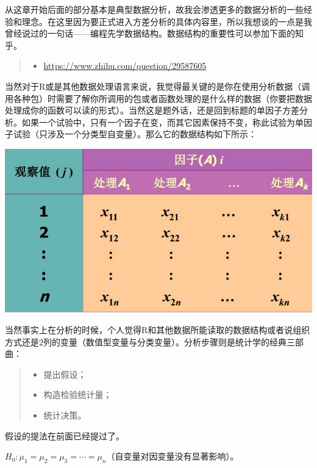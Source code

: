 \documentclass[]{ctexbook}
\providecommand{\tightlist}{%
  \setlength{\itemsep}{0pt}\setlength{\parskip}{0pt}}
\begin{document}
从这章开始后面的部分基本是典型数据分析，故我会渗透更多的数据分析的一些经验和理念。在这里因为要正式进入方差分析的具体内容里，所以我想谈的一点是我曾经说过的一句话------编程先学数据结构。数据结构的重要性可以参加下面的知乎。

\begin{quote}
\begin{itemize}
\tightlist
\item
  \url{https://www.zhihu.com/question/29587605}
\end{itemize}
\end{quote}

当然对于R或是其他数据处理语言来说，我觉得最关键的是你在使用分析数据（调用各种包）时需要了解你所调用的包或者函数处理的是什么样的数据（你要把数据处理成你的函数可以读的形式）。当然这是题外话，还是回到标题的单因子方差分析。如果一个试验中，只有一个因子在变，而其它因素保持不变，称此试验为单因子试验（只涉及一个分类型自变量）。那么它的数据结构如下所示：

\includegraphics[width=1\linewidth,height=0.35\textheight]{fig/fig21}

当然事实上在分析的时候，个人觉得R和其他数据所能读取的数据结构或者说组织方式还是2列的变量（数值型变量与分类变量）。分析步骤则是统计学的经典三部曲：

\begin{quote}
\begin{itemize}
\tightlist
\item
  提出假设；
\item
  构造检验统计量；
\item
  统计决策。
\end{itemize}
\end{quote}

假设的提法在前面已经提过了。

\(H_0:\mu_1=\mu_2=\mu_3=\cdots=\mu_n\)（自变量对因变量没有显著影响）。
\end{document}

